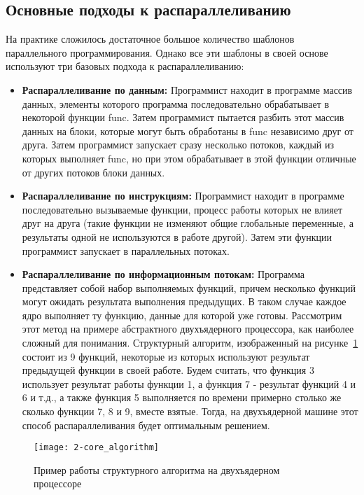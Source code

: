 \subsection{Основные подходы к распараллеливанию}

На практике сложилось достаточное большое количество шаблонов параллельного программирования. Однако все эти шаблоны в своей основе используют три базовых подхода к распараллеливанию:

\begin{itemize}
    \item\textbf{Распараллеливание по данным:} Программист находит в программе массив данных, элементы которого программа последовательно обрабатывает в некоторой функции func. Затем программист пытается разбить этот массив данных на блоки, которые могут быть обработаны в func независимо друг от друга. Затем программист запускает сразу несколько потоков, каждый из которых выполняет func, но при этом обрабатывает в этой функции отличные от других потоков блоки данных.
    \item\textbf{Распараллеливание по инструкциям:} Программист находит в программе последовательно вызываемые функции, процесс работы которых не влияет друг на друга (такие функции не изменяют общие глобальные переменные, а результаты одной не используются в работе другой). Затем эти функции программист запускает в параллельных потоках.
    \item\textbf{Распараллеливание по информационным потокам:} Программа представляет собой набор выполняемых функций, причем несколько функций могут ожидать результата выполнения предыдущих. В таком случае каждое ядро выполняет ту функцию, данные для которой уже готовы. Рассмотрим этот метод на примере абстрактного двухъядерного процессора, как наиболее сложный для понимания. Структурный алгоритм, изображенный на рисунке~\ref{structAlgorithm:image} состоит из 9 функций, некоторые из которых используют результат предыдущей функции в своей работе. Будем считать, что функция 3 использует результат работы функции 1, а функция 7 - результат функций 4 и 6 и т.д., а также функция 5 выполняется по времени примерно столько же сколько функции 7, 8 и 9, вместе взятые. Тогда, на двухъядерной машине этот способ распараллеливания будет оптимальным решением.
\end{itemize}

\begin{figure}[H]
    \texttt{[image: 2-core\_algorithm]}
    \caption{Пример работы структурного алгоритма на двухъядерном процессоре}
    \label{structAlgorithm:image}
\end{figure}

